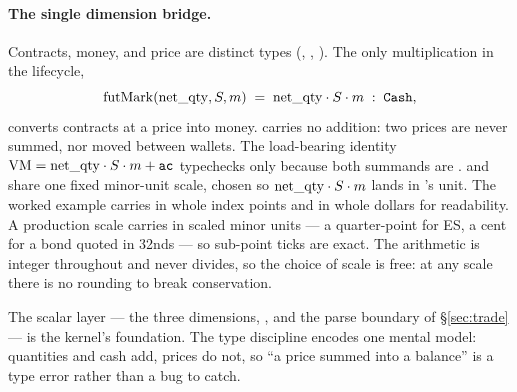 \paragraph{The single dimension bridge.} Contracts, money, and price are distinct types
(, , ). The only multiplication in the lifecycle,
\[
\mathrm{futMark}(\mathrm{net\_qty}, S, m) \;=\; \mathrm{net\_qty} \cdot S \cdot m \;:\; \texttt{Cash},
\]
converts contracts at a price into money.  carries no addition: two prices are never
summed, nor moved between wallets. The load-bearing identity $\mathrm{VM}=\mathrm{net\_qty}\cdot S\cdot m+\texttt{ac}$
typechecks only because both summands are .  and  share one fixed
minor-unit scale, chosen so $\mathrm{net\_qty}\cdot S\cdot m$ lands in 's unit. The worked example
carries  in whole index points and  in whole dollars for readability. A
production scale carries  in scaled minor units --- a quarter-point for ES, a cent for a
bond quoted in 32nds --- so sub-point ticks are exact. The arithmetic is integer throughout and never
divides, so the choice of scale is free: at any scale there is no rounding to break conservation.

The scalar layer --- the three dimensions, , and the  parse boundary of
\S\ref{sec:trade} --- is the kernel's foundation. The type discipline encodes one mental model:
quantities and cash add, prices do not, so ``a price summed into a balance'' is a type error rather
than a bug to catch.


